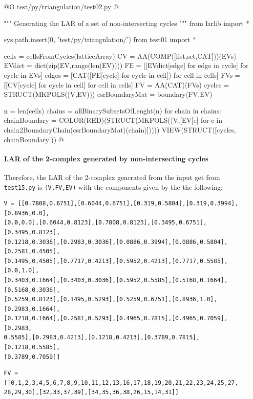 \documentclass[11pt,oneside]{article}	%
\begin{document}
@O test/py/triangulation/test02.py
@{""" Generating the LAR of a set of non-intersecting cycles """
from larlib import *

sys.path.insert(0, 'test/py/triangulation/')
from test01 import *

cells = cellsFromCycles(latticeArray)
CV = AA(COMP([list,set,CAT]))(EVs)
EVdict = dict(zip(EV,range(len(EV))))
FE = [[EVdict[edge] for edge in cycle] for cycle in EVs] 
edges = [CAT([FE[cycle] for cycle in cell]) for cell in cells]
FVs = [[CV[cycle] for cycle in cell] for cell in cells]
FV = AA(CAT)(FVs)
cycles = STRUCT(MKPOLS((V,EV)))
csrBoundaryMat = boundary(FV,EV)

n = len(cells)
chains = allBinarySubsetsOfLenght(n)
for chain in chains:
    chainBoundary = COLOR(RED)(STRUCT(MKPOLS((V,[EV[e] 
                        for e in chain2BoundaryChain(csrBoundaryMat)(chain)]))))
    VIEW(STRUCT([cycles, chainBoundary]))
@}


\paragraph{LAR of the 2-complex generated by non-intersecting cycles}

Therefore, the LAR of the 2-complex generated from the input get from \texttt{test15.py}
is \texttt{(V,FV,EV)} with the components given by the the following:

\begin{verbatim}
V = [[0.7808,0.6751],[0.6044,0.6751],[0.319,0.5804],[0.319,0.3994],[0.8936,0.0],
[0.0,0.0],[0.6044,0.8123],[0.7808,0.8123],[0.3495,0.6751],[0.3495,0.8123],
[0.1218,0.3036],[0.2983,0.3036],[0.0886,0.3994],[0.0886,0.5804],[0.2581,0.4505],
[0.1495,0.4505],[0.7717,0.4213],[0.5952,0.4213],[0.7717,0.5585],[0.0,1.0],
[0.3403,0.1664],[0.3403,0.3036],[0.5952,0.5585],[0.5168,0.1664],[0.5168,0.3036],
[0.5259,0.8123],[0.1495,0.5293],[0.5259,0.6751],[0.8936,1.0],[0.2983,0.1664],
[0.1218,0.1664],[0.2581,0.5293],[0.4965,0.7815],[0.4965,0.7059],[0.2983,
0.5585],[0.2983,0.4213],[0.1218,0.4213],[0.3789,0.7815],[0.1218,0.5585],
[0.3789,0.7059]]
\end{verbatim}

\begin{verbatim}
FV = [[0,1,2,3,4,5,6,7,8,9,10,11,12,13,16,17,18,19,20,21,22,23,24,25,27,
28,29,30],[32,33,37,39],[34,35,36,38,26,15,14,31]]
\end{verbatim}
\end{document}
